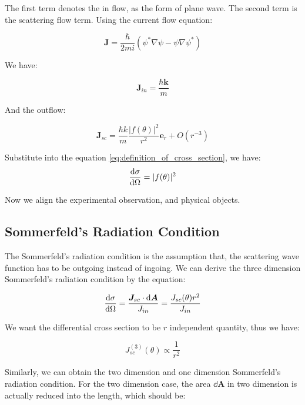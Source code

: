 \documentclass[../main.tex]{subfiles}
\begin{document}
The first term denotes the in flow, as the form of plane wave. The second term is the scattering flow term. Using the current flow equation:

\begin{equation}
    \bm{J} = \frac{\hbar}{2mi}(\psi^*\nabla \psi - \psi\nabla\psi^*)
\end{equation}

We have:

\begin{equation}
    \bm{J}_{in} = \frac{\hbar \bm{k}}{m}
\end{equation}

And the outflow:

\begin{equation}
    \bm{J}_{sc} = \frac{\hbar k}{m}\frac{|f(\theta)|^2}{r^2} \bm{e}_r + O(r^{-3})
\end{equation}

Substitute into the equation \ref{eq:definition_of_cross_section}, we have:
\begin{equation}
    \dv{\sigma}{\Omega} = |f(\theta)|^2
\end{equation}

Now we align the experimental observation, and physical objects.

\subsection{Sommerfeld's Radiation Condition}

The Sommerfeld's radiation condition is the assumption that, the scattering wave function has to be outgoing instead of ingoing. We can derive the three dimension Sommerfeld's radiation condition by the equation:

\begin{equation}
    \dv{\sigma}{\Omega} = \frac{\bm{J}_{sc} \cdot \dd{\bm{A}}}{J_{in}} = \frac{J_{sc}(\theta) r^2}{J_{in}}
\end{equation}

We want the differential cross section to be $r$ independent quantity, thus we have:

\begin{equation}
    J_{sc}^{(3)}(\theta) \propto \frac{1}{r^2}
\end{equation}

Similarly, we can obtain the two dimension and one dimension Sommerfeld's radiation condition. For the two dimension case, the area $\dd{\bm{A}}$ in two dimension is actually reduced into the length, which should be:
\end{document}
